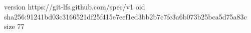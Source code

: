 version https://git-lfs.github.com/spec/v1
oid sha256:91241bd03c3166521df25f415e7eef1ed3bb2b7c7fc3a6b073b25bca5d75a83c
size 77
